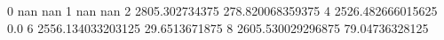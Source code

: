 0 nan nan
1 nan nan
2 2805.302734375 278.820068359375
4 2526.482666015625 0.0
6 2556.134033203125 29.6513671875
8 2605.530029296875 79.04736328125
